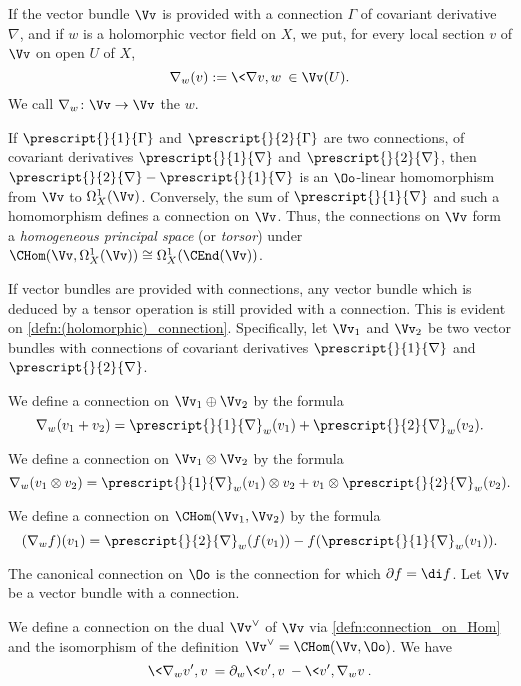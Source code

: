 \begin{para}
  If the vector bundle $\Vv$ is provided with a connection $\Gamma$ of covariant
  derivative $\nabla$, and if $w$ is a holomorphic vector field on $X$, we put,
  for every local section $v$ of $\Vv$ on open $U$ of $X$,
  \[
  \nabla_w(v):=\<\nabla v, w\> \in\Vv(U).
  \]
  We call $\nabla_w\colon\Vv\to\Vv$ the
   $w$.
\end{para}

\begin{para}\label{remark:torsor}
  If $\prescript{}{1}{\Gamma}$ and $\prescript{}{2}{\Gamma}$ are two
  connections, of covariant derivatives $\prescript{}{1}{\nabla}$ and
  $\prescript{}{2}{\nabla}$, then
  $\prescript{}{2}{\nabla}-\prescript{}{1}{\nabla}$ is an $\Oo$-linear
  homomorphism from $\Vv$ to $\Omega_X^1(\Vv)$.
  Conversely, the sum of $\prescript{}{1}{\nabla}$ and such a homomorphism
  defines a connection on $\Vv$.
  Thus, the connections on $\Vv$ form a \emph{homogeneous principal space}
  (or \emph{torsor}) under
  $\CHom(\Vv,\Omega_X^1(\Vv))\cong\Omega_X^1(\CEnd(\Vv))$.
\end{para}

\begin{para}
  If vector bundles are provided with connections, any vector bundle which is
  deduced by a tensor operation is still provided with a connection.
  This is evident on \ref{defn:(holomorphic)_connection}.
  Specifically, let $\Vv_1$ and $\Vv_2$ be two vector bundles with
  connections of covariant derivatives $\prescript{}{1}{\nabla}$ and
  $\prescript{}{2}{\nabla}$.
  \begin{subpara}
    We define a connection on $\Vv_1\oplus\Vv_2$ by the formula
    \[
    \nabla_w(v_1+v_2)=
    \prescript{}{1}{\nabla}_w(v_1)+\prescript{}{2}{\nabla}_w(v_2).
    \]
  \end{subpara}
  \begin{subpara}
    We define a connection on $\Vv_1\otimes\Vv_2$ by the formula
    \[
    \nabla_w(v_1\otimes v_2)=
    \prescript{}{1}{\nabla}_w(v_1)\otimes v_2+
    v_1\otimes\prescript{}{2}{\nabla}_w(v_2).
    \]
  \end{subpara}
  \begin{subpara}\label{defn:connection_on_Hom}
    We define a connection on $\CHom(\Vv_1,\Vv_2)$ by the formula
    \[
    (\nabla_wf)(v_1)=
    \prescript{}{2}{\nabla}_w(f(v_1))-
    f(\prescript{}{1}{\nabla}_w(v_1)).
    \]
  \end{subpara}
  The canonical connection on $\Oo$ is the connection
  for which $\partial f = \di f$.
  Let $\Vv$ be a vector bundle with a connection.
  \begin{subpara}
    We define a connection on the dual $\Vv^{\vee}$ of $\Vv$ via
    \ref{defn:connection_on_Hom} and the isomorphism of the definition
    $\Vv^{\vee}=\CHom(\Vv,\Oo)$. We have
    \[
    \<\nabla_w v', v\> = \partial_w\<v',v\> - \<v',\nabla_w v\>.
    \]
  \end{subpara}
\end{para}

